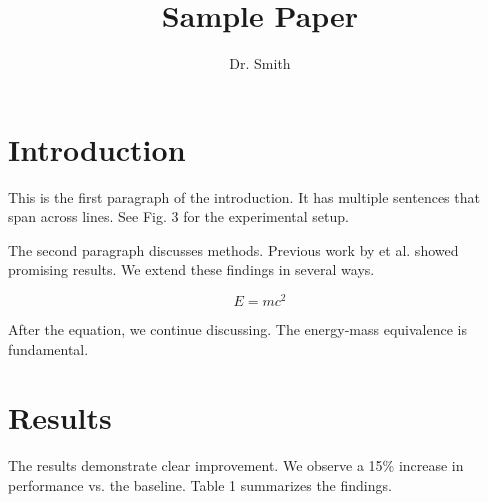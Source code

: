 \documentclass{article}
\title{Sample Paper}
\author{Dr. Smith}
\begin{document}
\maketitle

\section{Introduction}

This is the first paragraph of the introduction.
It has multiple sentences that span across lines.
See Fig. 3 for the experimental setup.

The second paragraph discusses methods.
Previous work by et al. showed promising results.
We extend these findings in several ways.

\begin{equation}
E = mc^2
\end{equation}

After the equation, we continue discussing.
The energy-mass equivalence is fundamental.

\section{Results}

The results demonstrate clear improvement.
We observe a 15\% increase in performance vs. the baseline.
Table 1 summarizes the findings.
\end{document}
